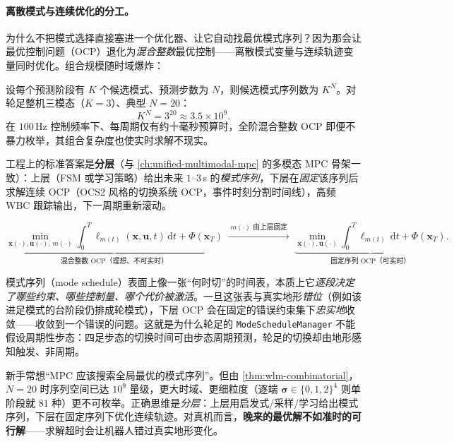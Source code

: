 \paragraph{离散模式与连续优化的分工。}
为什么不把模式选择直接塞进一个优化器、让它自动找最优模式序列？因为那会让最优控制问题（OCP）退化为\emph{混合整数}最优控制——离散模式变量与连续轨迹变量同时优化。组合规模随时域爆炸：

\begin{theorem}[模式序列的组合爆炸]\label{thm:wlm-combinatorial}
设每个预测阶段有 $K$ 个候选模式、预测步数为 $N$，则候选模式序列数为 $K^N$。对轮足整机三模态（$K=3$）、典型 $N=20$：
\begin{equation}
  K^N=3^{20}\approx3.5\times10^9.
  \label{eq:wlm-combinatorial}
\end{equation}
在 $100\,$Hz 控制频率下、每周期仅有约十毫秒预算时，全阶混合整数 OCP 即便不暴力枚举，其组合复杂度也使实时求解不现实。
\end{theorem}

\noindent 工程上的标准答案是\textbf{分层}（与 \cref{ch:unified-multimodal-mpc} 的多模态 MPC 骨架一致）：上层（FSM 或学习策略）给出未来 $1$–$3\,$s 的\emph{模式序列}，下层在\emph{固定}该序列后求解连续 OCP（OCS2 风格的切换系统 OCP，事件时刻分割时间线），高频 WBC 跟踪输出，下一周期重新滚动。

\begin{equation}
  \underbrace{\min_{\mathbf x(\cdot),\mathbf u(\cdot),\,m(\cdot)}\int_0^T\ell_{m(t)}(\mathbf x,\mathbf u,t)\,\mathrm dt+\Phi(\mathbf x_T)}_{\text{混合整数 OCP（理想、不可实时）}}
  \;\xrightarrow{\;m(\cdot)\text{ 由上层固定}\;}\;
  \underbrace{\min_{\mathbf x(\cdot),\mathbf u(\cdot)}\int_0^T\ell_{m(t)}\,\mathrm dt+\Phi(\mathbf x_T)}_{\text{固定序列 OCP（可实时）}}.
  \label{eq:wlm-layered}
\end{equation}

\begin{insight}\label{ins:wlm-schedule}
模式序列（mode schedule）表面上像一张“何时切”的时间表，本质上它\emph{逐段决定了哪些约束、哪些控制量、哪个代价被激活}。一旦这张表与真实地形\emph{错位}（例如该进足模式的台阶段仍排成轮模式），下层 OCP 会在固定的错误约束集下\emph{忠实地}收敛——收敛到一个错误的问题。这就是为什么轮足的 \texttt{ModeScheduleManager} 不能假设周期性步态：四足步态的切换时间可由步态周期预测，轮足的切换却由地形感知触发、非周期。
\end{insight}

\begin{pitfall}\label{pf:wlm-global}
新手常想“MPC 应该搜索全局最优的模式序列”。但由 \cref{thm:wlm-combinatorial}，$N=20$ 时序列空间已达 $10^9$ 量级，更大时域、更细粒度（逐端 $\boldsymbol\sigma\in\{0,1,2\}^4$ 则单阶段就 $81$ 种）更不可枚举。正确思维是\emph{分层}：上层用启发式/采样/学习给出模式序列，下层在固定序列下优化连续轨迹。对真机而言，\textbf{晚来的最优解不如准时的可行解}——求解超时会让机器人错过真实地形变化。
\end{pitfall}


